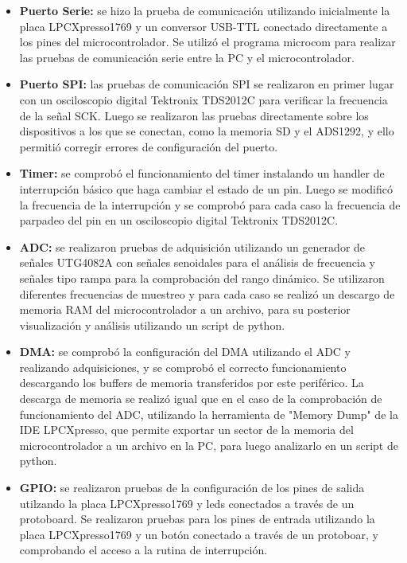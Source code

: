 \begin{itemize}

\item \textbf{Puerto Serie:} se hizo la prueba de comunicación utilizando inicialmente la placa LPCXpresso1769 y un conversor USB-TTL conectado directamente a los pines del microcontrolador. Se utilizó el programa microcom \citep{ubuntu2016} para realizar las pruebas de comunicación serie entre la PC y el microcontrolador.

\item \textbf{Puerto SPI:} las pruebas de comunicación SPI se realizaron en primer lugar con un osciloscopio digital Tektronix TDS2012C para verificar la frecuencia de la señal SCK. Luego se realizaron las pruebas directamente sobre los dispositivos a los que se conectan, como la memoria SD y el ADS1292, y ello permitió corregir errores de configuración del puerto.

\item \textbf{Timer:} se comprobó el funcionamiento del timer instalando un handler de interrupción básico que haga cambiar el estado de un pin. Luego se modificó la frecuencia de la interrupción y se comprobó para cada caso la frecuencia de parpadeo del pin en un osciloscopio digital Tektronix TDS2012C.

\item \textbf{ADC:} se realizaron pruebas de adquisición utilizando un generador de señales UTG4082A con señales senoidales para el análisis de frecuencia y señales tipo rampa para la comprobación del rango dinámico. Se utilizaron diferentes frecuencias de muestreo y para cada caso se realizó un descargo de memoria RAM del microcontrolador a un archivo, para su posterior visualización y análisis utilizando un script de python.

\item \textbf{DMA:} se comprobó la configuración del DMA utilizando el ADC y realizando adquisiciones, y se comprobó el correcto funcionamiento descargando los buffers de memoria transferidos por este periférico. La descarga de memoria se realizó igual que en el caso de la comprobación de funcionamiento del ADC, utilizando la herramienta de "Memory Dump" de la IDE LPCXpresso, que permite exportar un sector de la memoria del microcontrolador a un archivo en la PC, para luego analizarlo en un script de python.

\item \textbf{GPIO:} se realizaron pruebas de la configuración de los pines de salida utilzando la placa LPCXpresso1769 y leds conectados a través de un protoboard. Se realizaron pruebas para los pines de entrada utilizando la placa LPCXpresso1769 y un botón conectado a través de un protoboar, y comprobando el acceso a la rutina de interrupción.


\end{itemize}
